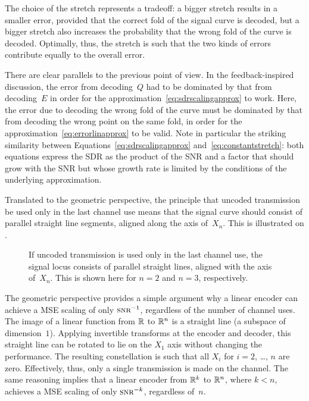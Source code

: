 The choice of the stretch represents a tradeoff: a bigger stretch results in a
smaller error, provided that the correct fold of the signal curve is decoded,
but a bigger stretch also increases the probability that the wrong fold of the
curve is decoded. Optimally, thus, the stretch is such that the two kinds of
errors contribute equally to the overall error. 

There are clear parallels to the previous point of view. In the
feedback-inspired discussion, the error from decoding~$Q$ had to be dominated by
that from decoding~$E$ in order for the
approximation~\eqref{eq:sdrscalingapprox} to work. Here, the error due to
decoding the wrong fold of the curve must be dominated by that from decoding the
wrong point on the same fold, in order for the
approximation~\eqref{eq:errorlinapprox} to be valid. Note in particular the
striking similarity between Equations~\ref{eq:sdrscalingapprox}
and~\ref{eq:constantstretch}: both equations express the SDR as the product of
the SNR and a factor that should grow with the SNR but whose growth rate is
limited by the conditions of the underlying approximation. 

Translated to the geometric perspective, the principle that uncoded transmission
be used only in the last channel use means that the signal curve should consist
of parallel straight line segments, aligned along the axis of~$X_n$. This is
illustrated on . 

\begin{figure}
  \centerline{%
  \subfloat[$n = 2$]{\label{fig:hybridlocus2}%
  }
  \hfil
  \subfloat[$n = 3$]{\label{fig:hybridlocus3}%
  }
  }
  \caption{If uncoded transmission is used only in the last channel use, the
  signal locus consists of parallel straight lines, aligned with the axis
  of~$X_n$. This is shown here for $n = 2$ and $n = 3$, respectively.}
  \label{fig:hybridlocus}
\end{figure}

\begin{remark}
  The geometric perspective provides a simple argument why a linear encoder
  can achieve a MSE scaling of only $\snr^{-1}$, regardless of the number of
  channel uses. The image of a linear function from $\mathbb{R}$ to $\mathbb{R}^n$ is a straight
  line (a subspace of dimension~$1$). Applying invertible transforms at the
  encoder and decoder, this straight line can be rotated to lie on the $X_1$
  axis without changing the performance. The resulting constellation is such
  that all $X_i$ for $i = 2$, \dots, $n$ are zero. Effectively, thus, only a
  single transmission is made on the channel. The same reasoning implies that a
  linear encoder from $\mathbb{R}^k$ to $\mathbb{R}^n$, where $k < n$, achieves a MSE scaling of
  only $\snr^{-k}$, regardless of~$n$. 
\end{remark}


